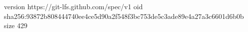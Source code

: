 version https://git-lfs.github.com/spec/v1
oid sha256:93872b808444740ee4ce5d90a2f548f3bc753de5c3ade89e4a27a3c6601d6b0b
size 429
